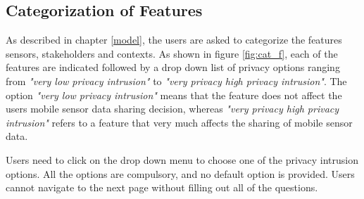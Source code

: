 \subsection{Categorization of Features} \label{cat_feature}

As described in chapter \ref{model}, the users are asked to categorize the features sensors, stakeholders and contexts. As shown in figure 
\ref{fig:cat_f}, each of the features are indicated followed by a drop down list of privacy options ranging from \textit{"very low privacy intrusion"} to \textit{"very privacy high privacy intrusion"}. The option \textit{"very low privacy intrusion"} means that the feature does not affect the users mobile sensor data sharing decision, whereas 
\textit{"very privacy high privacy intrusion"} refers to a feature that very much affects the sharing of mobile sensor data. 

Users need to click on the
drop down menu to choose one of the privacy intrusion options. All the options are compulsory, and no default option is provided. Users cannot navigate to the next page without filling out all of the questions.

